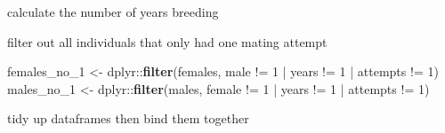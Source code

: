 \documentclass[]{article}
\newenvironment{Shaded}{\begin{snugshade}}{\end{snugshade}}
\newcommand{\KeywordTok}[1]{\textcolor[rgb]{0.13,0.29,0.53}{\textbf{{#1}}}}
\newcommand{\DecValTok}[1]{\textcolor[rgb]{0.00,0.00,0.81}{{#1}}}
\newcommand{\StringTok}[1]{\textcolor[rgb]{0.31,0.60,0.02}{{#1}}}
\newcommand{\NormalTok}[1]{{#1}}
\begin{document}
\begin{Shaded}
\end{Shaded}

calculate the number of years breeding

\begin{Shaded}
\end{Shaded}

filter out all individuals that only had one mating attempt

\begin{Shaded}
\begin{Highlighting}[]
\NormalTok{females_no_1 <-}\StringTok{ }\NormalTok{dplyr::}\KeywordTok{filter}\NormalTok{(females, male  !=}\StringTok{ }\DecValTok{1} \NormalTok{|}\StringTok{ }\NormalTok{years !=}\StringTok{ }\DecValTok{1} \NormalTok{|}\StringTok{ }\NormalTok{attempts !=}\StringTok{ }\DecValTok{1}\NormalTok{)}
\NormalTok{males_no_1 <-}\StringTok{ }\NormalTok{dplyr::}\KeywordTok{filter}\NormalTok{(males, female  !=}\StringTok{ }\DecValTok{1} \NormalTok{|}\StringTok{ }\NormalTok{years !=}\StringTok{ }\DecValTok{1} \NormalTok{|}\StringTok{ }\NormalTok{attempts !=}\StringTok{ }\DecValTok{1}\NormalTok{)}
\end{Highlighting}
\end{Shaded}

tidy up dataframes then bind them together
\end{document}
